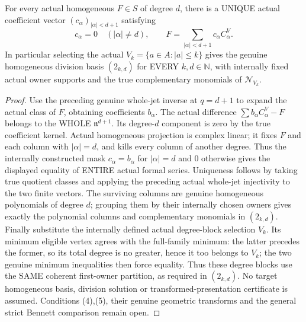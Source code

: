 \begin{theorem}
\label{hir:actual-selected-vertex-homogeneous-division-basis}
For every actual homogeneous $F\in S$ of degree $d$, there is a UNIQUE
actual coefficient vector $(c_\alpha)_{|\alpha|<d+1}$ satisfying
\[
 c_\alpha=0\quad(|\alpha|\ne d),\qquad
 F=\sum_{|\alpha|<d+1}c_\alpha C^V_\alpha.
\]
In particular selecting the actual $V_k=\{a\in A:|a|\le k\}$
gives the genuine homogeneous division basis $(2_{k,d})$ for EVERY
$k,d\in\mathbb N$, with internally fixed actual owner supports and
the true complementary monomials of $\mathcal N_{V_k}$.
\leanok
\end{theorem}
\begin{proof}
Use the preceding genuine whole-jet inverse at $q=d+1$ to expand the
actual class of $F$, obtaining coefficients $b_\alpha$. The actual
difference $\sum b_\alpha C^V_\alpha-F$ belongs to the WHOLE
$\mathfrak n^{d+1}$. Its degree-$d$ component is zero by the true
coefficient kernel. Actual homogeneous projection is complex linear;
it fixes $F$ and each column with $|\alpha|=d$, and kills every column
of another degree. Thus the internally constructed mask
$c_\alpha=b_\alpha$ for $|\alpha|=d$ and $0$ otherwise gives the
displayed equality of ENTIRE actual formal series. Uniqueness follows
by taking true quotient classes and applying the preceding actual
whole-jet injectivity to the two finite vectors. The surviving columns
are genuine homogeneous polynomials of degree $d$; grouping them by
their internally chosen owners gives exactly the polynomial columns
and complementary monomials in $(2_{k,d})$. Finally substitute the
internally defined actual degree-block selection $V_k$. Its minimum
eligible vertex agrees with the full-family minimum: the latter
precedes the former, so its total degree is no greater, hence it too
belongs to $V_k$; the two genuine minimum inequalities then force
equality. Thus these degree blocks use the SAME coherent first-owner
partition, as required in $(2_{k,d})$. No target
homogeneous basis, division solution or transformed-presentation
certificate is assumed. Conditions (4),(5), their genuine geometric
transforms and the general strict Bennett comparison remain open.
\end{proof}
